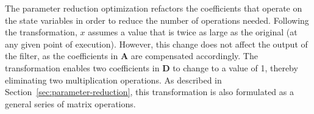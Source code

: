 The parameter reduction optimization refactors the coefficients that
operate on the state variables in order to reduce the number of
operations needed.  Following the transformation, $x$ assumes a value
that is twice as large as the original (at any given point of
execution).  However, this change does not affect the output of the
filter, as the coefficients in $\mathbf{A}$ are compensated
accordingly.  The transformation enables two coefficients in $\mathbf{D}$
to change to a value of 1, thereby eliminating two multiplication
operations.  As described in Section~\ref{sec:parameter-reduction},
this transformation is also formulated as a general series of matrix
operations.




